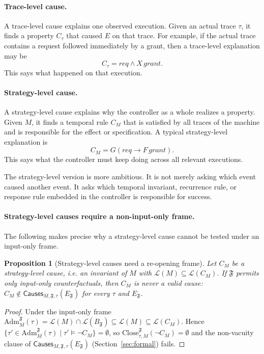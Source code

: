 \documentclass[11pt]{article}
\newtheorem{proposition}{Proposition}
\theoremstyle{remark}
\newcommand{\Close}{\mathrm{Close}}
\newcommand{\Lang}{\mathcal{L}}
\newcommand{\Frame}{\mathfrak{F}}
\newcommand{\Adm}{\mathrm{Adm}}
\begin{document}
\paragraph{Trace-level cause.}
A trace-level cause explains one observed execution. Given an actual trace
\(\tau\), it finds a property \(C_\tau\) that caused \(E\) on that trace. For
example, if the actual trace contains a request followed immediately by a grant,
then a trace-level explanation may be
\[
  C_\tau = req \land X\,grant .
\]
This says what happened on that execution.

\paragraph{Strategy-level cause.}
A strategy-level cause explains why the controller as a whole realizes a
property. Given \(M\), it finds a temporal rule \(C_M\) that is satisfied by all
traces of the machine and is responsible for the effect or specification. A
typical strategy-level explanation is
\[
  C_M = G(req\rightarrow F\,grant).
\]
This says what the controller must keep doing across all relevant executions.

The strategy-level version is more ambitious. It is not merely asking which
event caused another event. It asks which temporal invariant, recurrence rule,
or response rule embedded in the controller is responsible for success.

\paragraph{Strategy-level causes require a non-input-only frame.}
The following makes precise why a strategy-level cause cannot be tested under an
input-only frame.

\begin{proposition}[Strategy-level causes need a re-opening frame]
\label{prop:strategy-frame}
Let \(C_M\) be a strategy-level cause, i.e. an invariant of \(M\) with
\(\Lang(M)\subseteq\Lang(C_M)\). If \(\Frame\) permits only input-only
counterfactuals, then \(C_M\) is never a valid cause:
\(C_M\notin\mathsf{Causes}_{M,\Frame,\tau}(E_{\Frame})\) for every \(\tau\) and
\(E_{\Frame}\).
\end{proposition}

\begin{proof}
Under the input-only frame
\(\Adm_M^{\Frame}(\tau)=\Lang(M)\cap\Lang(B_{\Frame})\subseteq\Lang(M)
\subseteq\Lang(C_M)\). Hence
\(\{\tau'\in\Adm_M^{\Frame}(\tau)\mid\tau'\models\neg C_M\}=\emptyset\), so
\(\Close_{\tau,M}^{\Frame}(\neg C_M)=\emptyset\) and the non-vacuity clause of
\(\mathsf{Causes}_{M,\Frame,\tau}(E_{\Frame})\) (Section~\ref{sec:formal}) fails.
\end{proof}
\end{document}
